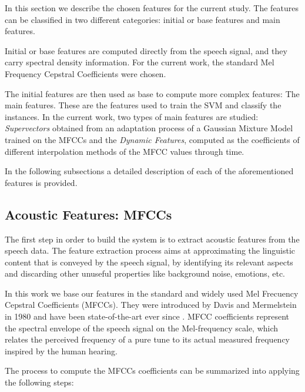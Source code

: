 In this section we describe the chosen features for the current study. The features can be classified in two different categories: initial or base features and main features.

Initial or base features are computed directly from the speech signal, and they carry spectral density information. For the current work, the standard Mel Frequency Cepstral Coefficients
were chosen.

The initial features are then used as base to compute more complex features:
The main features. These
are the features used to train the SVM and classify the instances. In the current work, two
types of main features are studied: \textit{Supervectors} obtained from an adaptation process of
a Gaussian Mixture Model trained on the MFCCs and the \textit{Dynamic Features}, computed
as the coefficients of different interpolation methods of the MFCC values through time.

In the following subsections a detailed description of each of the aforementioned features is
provided.

\subsection{Acoustic Features: MFCCs}

The first step in order to build the system is to extract acoustic features from the speech data.
The feature extraction process aims at approximating the linguistic content that is conveyed
by the speech signal, by identifying its relevant aspects and discarding other unuseful
properties like background noise, emotions, etc.

In this work we base our features in the standard and widely used Mel Frecuency
Cepstral Coefficients (MFCCs). They were introduced by Davis and Mermelstein in 1980 and
have been state-of-the-art ever since \cite{mfcc_foundational}.
MFCC coefficients represent the spectral envelope of the speech signal on the Mel-frequency scale,
which relates the perceived frequency of a pure tune to its actual measured frequency inspired
by the human hearing.

The process to compute the MFCCs coefficients can be summarized into applying the following steps:

